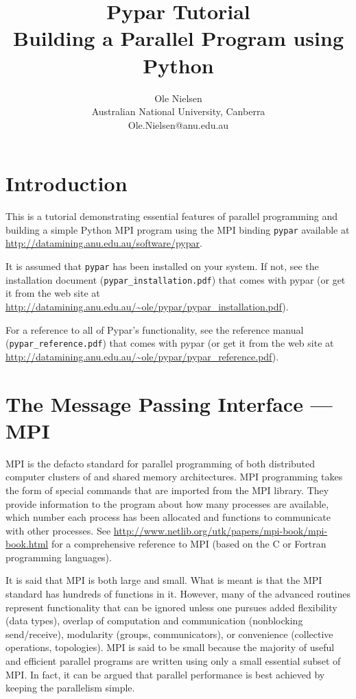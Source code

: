 \documentclass[12pt]{article}
\begin{document}
\title{Pypar Tutorial\\
Building a Parallel Program using Python}


\author{Ole Nielsen \\
Australian National University, Canberra \\
Ole.Nielsen@anu.edu.au}

\maketitle
\section*{Introduction}

This is a tutorial demonstrating essential
features of parallel programming and building
a simple Python MPI program using the MPI binding \texttt{pypar} available at
\url{http://datamining.anu.edu.au/software/pypar}.

It is assumed that \texttt{pypar} has been installed on your system.
If not, see the installation document (\texttt{pypar\_installation.pdf})
that comes with pypar
(or get it from the web site at
\url{http://datamining.anu.edu.au/~ole/pypar/pypar_installation.pdf}).

For a reference to all of Pypar's functionality, see the
reference manual (\texttt{pypar\_reference.pdf})
that comes with pypar (or get it from the web site at
\url{http://datamining.anu.edu.au/~ole/pypar/pypar_reference.pdf}).


\section{The Message Passing Interface --- MPI}
MPI is the defacto standard for parallel programming of both
distributed computer clusters of and shared memory architectures.
MPI programming takes the form of special commands that are
imported from the MPI library. They provide information to the program
about how many processes are available, which number each process has been
allocated and functions to communicate with other processes.
See \url{http://www.netlib.org/utk/papers/mpi-book/mpi-book.html} for
a comprehensive reference to MPI (based on
the C or Fortran programming languages).

It is said that MPI is both large and small. What is meant is that the
MPI standard has hundreds of functions in it. However, many of the
advanced routines represent functionality that can be ignored unless
one pursues added flexibility (data types), overlap of computation and
communication (nonblocking send/receive), modularity (groups,
communicators), or convenience (collective operations, topologies).
MPI is said to be small because the majority of useful and efficient
parallel programs are written using only a small essential subset of MPI.
In fact, it can be argued that parallel performance is best achieved by
keeping the parallelism simple.
\end{document}
